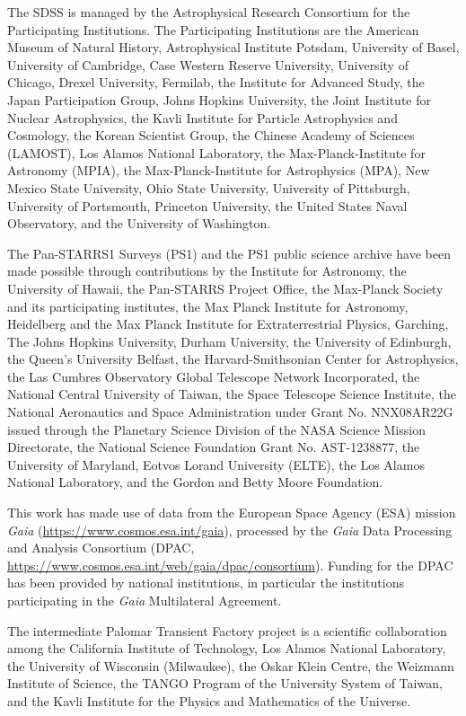 \begin{acknowledgements}
The SDSS is managed by the Astrophysical Research Consortium for the Participating Institutions. The Participating Institutions are the American Museum of Natural History, Astrophysical Institute Potsdam, University of Basel, University of Cambridge, Case Western Reserve University, University of Chicago, Drexel University, Fermilab, the Institute for Advanced Study, the Japan Participation Group, Johns Hopkins University, the Joint Institute for Nuclear Astrophysics, the Kavli Institute for Particle Astrophysics and Cosmology, the Korean Scientist Group, the Chinese Academy of Sciences (LAMOST), Los Alamos National Laboratory, the Max-Planck-Institute for Astronomy (MPIA), the Max-Planck-Institute for Astrophysics (MPA), New Mexico State University, Ohio State University, University of Pittsburgh, University of Portsmouth, Princeton University, the United States Naval Observatory, and the University of Washington.

The Pan-STARRS1 Surveys (PS1) and the PS1 public science archive have been made possible through contributions by the Institute for Astronomy, the University of Hawaii, the Pan-STARRS Project Office, the Max-Planck Society and its participating institutes, the Max Planck Institute for Astronomy, Heidelberg and the Max Planck Institute for Extraterrestrial Physics, Garching, The Johns Hopkins University, Durham University, the University of Edinburgh, the Queen's University Belfast, the Harvard-Smithsonian Center for Astrophysics, the Las Cumbres Observatory Global Telescope Network Incorporated, the National Central University of Taiwan, the Space Telescope Science Institute, the National Aeronautics and Space Administration under Grant No. NNX08AR22G issued through the Planetary Science Division of the NASA Science Mission Directorate, the National Science Foundation Grant No. AST-1238877, the University of Maryland, Eotvos Lorand University (ELTE), the Los Alamos National Laboratory, and the Gordon and Betty Moore Foundation.

This work has made use of data from the European Space Agency (ESA) mission
{\it Gaia} (\url{https://www.cosmos.esa.int/gaia}), processed by the {\it Gaia}
Data Processing and Analysis Consortium (DPAC,
\url{https://www.cosmos.esa.int/web/gaia/dpac/consortium}). Funding for the DPAC
has been provided by national institutions, in particular the institutions
participating in the {\it Gaia} Multilateral Agreement.

The intermediate Palomar Transient Factory project is a scientific collaboration among the California Institute of Technology, Los Alamos National Laboratory, the University of Wisconsin (Milwaukee), the Oskar Klein Centre, the Weizmann Institute of Science, the TANGO Program of the University System of Taiwan, and the Kavli Institute for the Physics and Mathematics of the Universe.


\end{acknowledgements}
